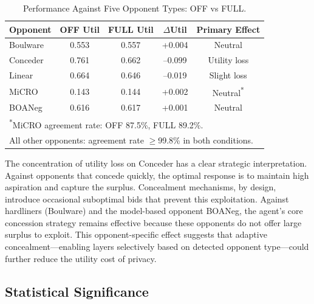 \documentclass[runningheads]{llncs}
\begin{document}
\begin{table}[t]
\centering
\caption{Performance Against Five Opponent Types: OFF vs FULL.}
\label{tab:opponents}
\small
\renewcommand{\arraystretch}{1.15}
\begin{tabular}{lcccc}
\toprule
\textbf{Opponent} & \textbf{OFF Util} & \textbf{FULL Util} & $\Delta$\textbf{Util} & \textbf{Primary Effect} \\
\midrule
Boulware    & 0.553 & 0.557 & +0.004 & Neutral \\
Conceder    & 0.761 & 0.662 & --0.099 & Utility loss \\
Linear      & 0.664 & 0.646 & --0.019 & Slight loss \\
MiCRO       & 0.143 & 0.144 & +0.002 & Neutral\textsuperscript{*} \\
BOANeg      & 0.616 & 0.617 & +0.001 & Neutral \\
\bottomrule
\multicolumn{5}{l}{\footnotesize \textsuperscript{*}MiCRO agreement rate: OFF 87.5\%, FULL 89.2\%.} \\
\multicolumn{5}{l}{\footnotesize All other opponents: agreement rate $\geq$99.8\% in both conditions.} \\
\end{tabular}
\end{table}

The concentration of utility loss on Conceder has a clear strategic interpretation. Against opponents that concede quickly, the optimal response is to maintain high aspiration and capture the surplus. Concealment mechanisms, by design, introduce occasional suboptimal bids that prevent this exploitation. Against hardliners (Boulware) and the model-based opponent BOANeg, the agent's core concession strategy remains effective because these opponents do not offer large surplus to exploit. This opponent-specific effect suggests that adaptive concealment---enabling layers selectively based on detected opponent type---could further reduce the utility cost of privacy.

\subsection{Statistical Significance}
\end{document}
